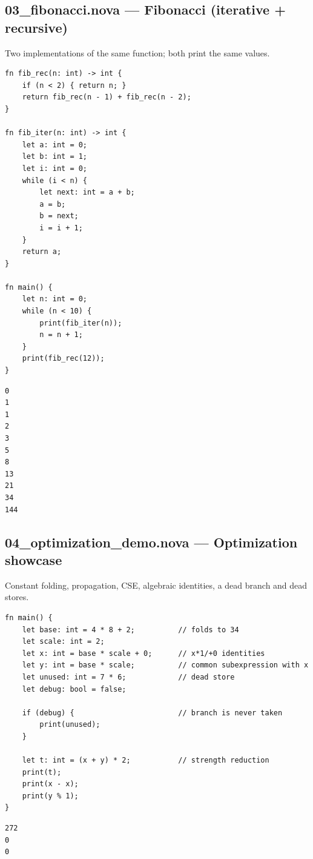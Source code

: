 \subsection*{03\_fibonacci.nova --- Fibonacci (iterative + recursive)}
\noindent Two implementations of the same function; both print the same values.
\begin{lstlisting}[language=nova,]
fn fib_rec(n: int) -> int {
    if (n < 2) { return n; }
    return fib_rec(n - 1) + fib_rec(n - 2);
}

fn fib_iter(n: int) -> int {
    let a: int = 0;
    let b: int = 1;
    let i: int = 0;
    while (i < n) {
        let next: int = a + b;
        a = b;
        b = next;
        i = i + 1;
    }
    return a;
}

fn main() {
    let n: int = 0;
    while (n < 10) {
        print(fib_iter(n));
        n = n + 1;
    }
    print(fib_rec(12));
}
\end{lstlisting}
\begin{tcolorbox}[colback=green!4,colframe=green!45!black,title={Program output (optimized VM)},fonttitle=\bfseries\small,boxsep=2pt,left=4pt,right=4pt,top=2pt,bottom=2pt]
\begin{lstlisting}[basicstyle=\ttfamily\scriptsize,frame=none,backgroundcolor=\color{white}]
0
1
1
2
3
5
8
13
21
34
144
\end{lstlisting}
\end{tcolorbox}
\subsection*{04\_optimization\_demo.nova --- Optimization showcase}
\noindent Constant folding, propagation, CSE, algebraic identities, a dead branch and dead stores.
\begin{lstlisting}[language=nova,]
fn main() {
    let base: int = 4 * 8 + 2;          // folds to 34
    let scale: int = 2;
    let x: int = base * scale + 0;      // x*1/+0 identities
    let y: int = base * scale;          // common subexpression with x
    let unused: int = 7 * 6;            // dead store
    let debug: bool = false;

    if (debug) {                        // branch is never taken
        print(unused);
    }

    let t: int = (x + y) * 2;           // strength reduction
    print(t);
    print(x - x);
    print(y % 1);
}
\end{lstlisting}
\begin{tcolorbox}[colback=green!4,colframe=green!45!black,title={Program output (optimized VM)},fonttitle=\bfseries\small,boxsep=2pt,left=4pt,right=4pt,top=2pt,bottom=2pt]
\begin{lstlisting}[basicstyle=\ttfamily\scriptsize,frame=none,backgroundcolor=\color{white}]
272
0
0
\end{lstlisting}
\end{tcolorbox}
